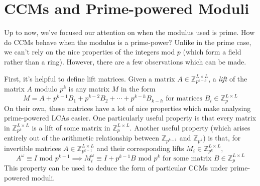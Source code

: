 \documentclass[a4paper, 12pt, reqno]{amsart}
\begin{document}
\begin{comment}
	So, when our minimal polynomial has repeated linear terms, the CCMs of the matrix $A$ are likely to be "unjustified" in the sense that they evaluate to zero even when
	vectors of the target cycle length exist. Unfortunately, proving this relation in the other direction is a lot harder (i.e. if the CCMs of the matrix are unjustified,
	then the minimal polynomial must have a repeated linear root). If this other direction could be proved, it would serve as the basis for understanding when CCMs can and
	can't be used to gain insights on the cycle lengths of vectors under some update matrix $A$.
	\end{comment}
	
	\section{CCMs and Prime-powered Moduli}
	Up to now, we've focused our attention on when the modulus used is prime. How do CCMs behave when the modulus is a prime-power? Unlike in the prime case, we can't
	rely on the nice properties of the integers mod $p$ (which form a field rather than a ring). However, there are a few observations which can be made.
	
	First, it's helpful to define lift matrices. Given a matrix $A \in \mathds{Z}_{p^{k-h}}^{L \times L}$, a \emph{lift} of the matrix $A$ modulo $p^k$ is any matrix $M$ in 
	the form
	\[
		M = A + p^{k-1}B_{1} + p^{k-2}B_{2} + \cdots + p^{k-h}B_{k-h} \text{ for matrices } B_{i} \in \mathds{Z}_{p}^{L \times L}
	\]
	On their own, these matrices have a lot of nice properties which make analysing prime-powered LCAs easier. One particularly useful property is that every matrix in
	$\mathds{Z}_{p^k}^{L \times L}$ is a lift of some matrix in $\mathds{Z}_{p}^{L \times L}$. Another useful property (which arises entirely out of the arithmetic 
	relationship between $\mathds{Z}_{p^{k-1}}$ and $\mathds{Z}_{p^{k}}$) is that, for invertible matrices $A \in \mathds{Z}_{p^{k-1}}^{L \times L}$ and their corresponding 
	lifts $M_{i} \in \mathds{Z}_{p^k}^{L \times L}$,
	\begin{equation}
		\label{imp:liftToTheOmega}
		A^{\omega} \equiv I \text{ mod } p^{k-1} \implies M_{i}^{\omega} \equiv I + p^{k-1}B \text{ mod } p^{k} \text{ for some matrix } B \in \mathds{Z}_{p}^{L \times L}
	\end{equation}
	This property can be used to deduce the form of particular CCMs under prime-powered moduli.
	
\end{document}
